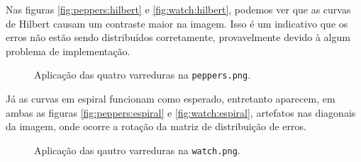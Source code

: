 Nas figuras \ref{fig:peppers:hilbert} e \ref{fig:watch:hilbert}, podemos ver que as curvas de Hilbert causam um contraste maior na imagem. Isso é um indicativo que os erros não estão sendo distribuídos corretamente, provavelmente devido à algum problema de implementação.

\begin{figure}[H]
    \centering
    
    \caption{Aplicação das quatro varreduras na \texttt{peppers.png}.}
    \label{fig:extra:peppers}
\end{figure}

Já as curvas em espiral funcionam como esperado, entretanto aparecem, em ambas as figuras \ref{fig:peppers:espiral} e \ref{fig:watch:espiral}, artefatos nas diagonais da imagem, onde ocorre a rotação da matriz de distribuição de erros.

\begin{figure}[H]
    \centering
    
    \caption{Aplicação das qautro varreduras na \texttt{watch.png}.}
    \label{fig:extra:watch}
\end{figure}

